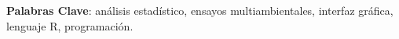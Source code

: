 \textbf{Palabras Clave}: análisis estadístico, ensayos multiambientales, interfaz gráfica, lenguaje R, programación.

